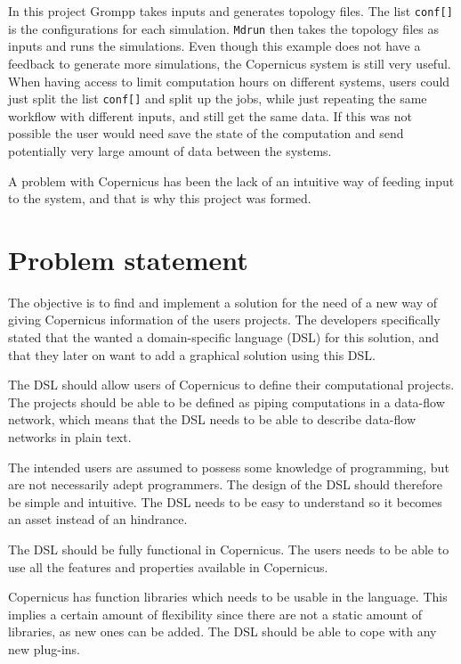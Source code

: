 In this project Grompp takes inputs and generates topology files. The
list \verb#conf[]# is the configurations for each
simulation. \verb#Mdrun# then takes the topology files as inputs and
runs the simulations. Even though this example does not have a
feedback to generate more simulations, the Copernicus system is still
very useful. When having access to limit computation hours on
different systems, users could just split the list \verb#conf[]# and
split up the jobs, while just repeating the same workflow with
different inputs, and still get the same data. If this was not
possible the user would need save the state of the computation and
send potentially very large amount of data between the systems.


A problem with Copernicus has been the lack of an intuitive way of
feeding input to the system, and that is why this project was formed.


\section{Problem statement}
The objective is to find and implement a solution for the need of a
new way of giving Copernicus information of the users projects. The
developers specifically stated that the wanted a domain-specific
language (DSL) for this solution, and that they later on want to add a
graphical solution using this DSL.

The DSL should allow users of Copernicus to define their computational
projects. The projects should be able to be defined as piping
computations in a data-flow network, which means that the DSL needs to
be able to describe data-flow networks in plain text.

The intended users are assumed to possess some knowledge of
programming, but are not necessarily adept programmers. The design of
the DSL should therefore be simple and intuitive. The DSL needs to be
easy to understand so it becomes an asset instead of an hindrance.

The DSL should be fully functional in Copernicus. The users needs to
be able to use all the features and properties available in
Copernicus.

Copernicus has function libraries which needs to be usable in the
language. This implies a certain amount of flexibility since there are
not a static amount of libraries, as new ones can be added. The DSL
should be able to cope with any new plug-ins.

